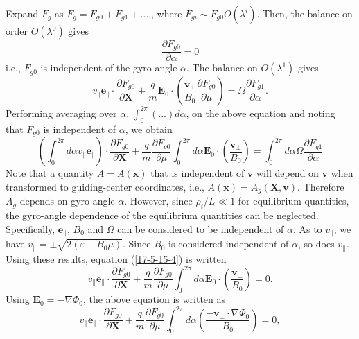 \documentclass{article}
\begin{document}
Expand $F_g$ as $F_g = F_{g 0} + F_{g 1} + \ldots$., where $F_{g i} \sim F_{g
0} O (\lambda^i)$. Then, the balance on order $O (\lambda^0)$ gives
\begin{equation}
  \frac{\partial F_{g 0}}{\partial \alpha} = 0
\end{equation}
i.e., $F_{g 0}$ is independent of the gyro-angle $\alpha$. The balance on $O
(\lambda^1)$ gives
\begin{equation}
  v_{\parallel} \mathbf{e}_{\parallel} \cdot \frac{\partial F_{g 0}}{\partial
  \mathbf{X}} + \frac{q}{m} \mathbf{E}_0 \cdot \left(
  \frac{\mathbf{v}_{\perp}}{B_0}  \frac{\partial F_{g 0}}{\partial \mu}
  \right) = \Omega \frac{\partial F_{g 1}}{\partial \alpha} .
\end{equation}
Performing averaging over $\alpha$, $\int_0^{2 \pi} (\ldots) d \alpha$, on the
above equation and noting that $F_{g 0}$ is independent of $\alpha$, we obtain
\begin{equation}
  \label{17-5-15-4} \left( \int_0^{2 \pi} d \alpha v_{\parallel}
  \mathbf{e}_{\parallel} \right) \cdot \frac{\partial F_{g 0}}{\partial
  \mathbf{X}} + \frac{q}{m} \frac{\partial F_{g 0}}{\partial \mu} \int_0^{2
  \pi} d \alpha \mathbf{E}_0 \cdot \left( \frac{\mathbf{v}_{\perp}}{B_0} 
  \right) = \int_0^{2 \pi} d \alpha \Omega \frac{\partial F_{g 1}}{\partial
  \alpha}
\end{equation}
Note that a quantity $A = A (\mathbf{x})$ that is independent of $\mathbf{v}$
will depend on $\mathbf{v}$ when transformed to guiding-center coordinates,
i.e., $A (\mathbf{x}) = A_g (\mathbf{X}, \mathbf{v})$. Therefore $A_g$ depends
on gyro-angle $\alpha$. However, since $\rho_i / L \ll 1$ for equilibrium
quantities, the gyro-angle dependence of the equilibrium quantities can be
neglected. Specifically, $\mathbf{e}_{\parallel}$, $B_0$ and $\Omega$ can be
considered to be independent of $\alpha$. As to $v_{\parallel}$, we have
$v_{\parallel} = \pm \sqrt{2 (\varepsilon - B_0 \mu)}$. Since $B_0$ is
considered independent of $\alpha$, so does $v_{\parallel}$. Using these
results, equation (\ref{17-5-15-4}) is written
\begin{equation}
  v_{\parallel} \mathbf{e}_{\parallel} \cdot \frac{\partial F_{g 0}}{\partial
  \mathbf{X}} + \frac{q}{m}  \frac{\partial F_{g 0}}{\partial \mu} \int_0^{2
  \pi} d \alpha \mathbf{E}_0 \cdot \left( \frac{\mathbf{v}_{\perp}}{B_0}
  \right) = 0.
\end{equation}
Using $\mathbf{E}_0 = - \nabla \Phi_0$, the above equation is written as
\begin{equation}
  \label{16-11-16-p1} v_{\parallel} \mathbf{e}_{\parallel} \cdot
  \frac{\partial F_{g 0}}{\partial \mathbf{X}} + \frac{q}{m}  \frac{\partial
  F_{g 0}}{\partial \mu} \int_0^{2 \pi} d \alpha \left(
  \frac{-\mathbf{v}_{\perp} \cdot \nabla \Phi_0}{B_0}  \right) = 0,
\end{equation}
\end{document}
